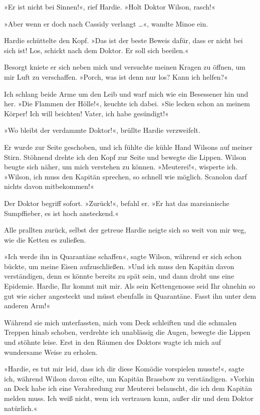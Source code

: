 »Er ist nicht bei Sinnen!«, rief Hardie. »Holt Doktor Wilson,
rasch!«

»Aber wenn er doch nach Cassidy verlangt \ldots{}«, wandte Minoe ein.

Hardie schüttelte den Kopf. »Das ist der beste Beweis dafür, dass
er nicht bei sich ist! Los, schickt nach dem Doktor. Er soll sich
beeilen.«

Besorgt kniete er sich neben mich und versuchte meinen Kragen zu
öffnen, um mir Luft zu verschaffen. »Porch, was ist denn nur los?
Kann ich helfen?«

Ich schlang beide Arme um den Leib und warf mich wie ein Besessener
hin und her. »Die Flammen der Hölle!«, keuchte ich dabei. »Sie
lecken schon an meinem Körper! Ich will beichten! Vater, ich habe
gesündigt!«

»Wo bleibt der verdammte Doktor!«, brüllte Hardie verzweifelt.

Er wurde zur Seite geschoben, und ich fühlte die kühle Hand Wilsons
auf meiner Stirn. Stöhnend drehte ich den Kopf zur Seite und
bewegte die Lippen. Wilson beugte sich näher, um mich verstehen zu
können. »Meuterei!«, wisperte ich. »Wilson, ich muss den Kapitän
sprechen, so schnell wie möglich. Scanolon darf nichts davon
mitbekommen!«

Der Doktor begriff sofort. »Zurück!«, befahl er. »Er hat das
marsianische Sumpffieber, es ist hoch ansteckend.«

Alle prallten zurück, selbst der getreue Hardie neigte sich so weit
von mir weg, wie die Ketten es zuließen.

»Ich werde ihn in Quarantäne schaffen«, sagte Wilson, während er
sich schon bückte, um meine Eisen aufzuschließen. »Und ich muss den
Kapitän davon verständigen, denn es könnte bereits zu spät sein,
und dann droht uns eine Epidemie. Hardie, Ihr kommt mit mir. Als
sein Kettengenosse seid Ihr ohnehin so gut wie sicher angesteckt
und müsst ebenfalls in Quarantäne. Fasst ihn unter dem anderen
Arm!«

Während sie mich unterfassten, mich vom Deck schleiften und die
schmalen Treppen hinab schoben, verdrehte ich unablässig die Augen,
bewegte die Lippen und stöhnte leise. Erst in den Räumen des
Doktors wagte ich mich auf wundersame Weise zu erholen.

»Hardie, es tut mir leid, dass ich dir diese Komödie vorspielen
musste!«, sagte ich, während Wilson davon eilte, um Kapitän
Brassbow zu verständigen. »Vorhin an Deck habe ich eine Verabredung
zur Meuterei belauscht, die ich dem Kapitän melden muss. Ich weiß
nicht, wem ich vertrauen kann, außer dir und dem Doktor
natürlich.«

